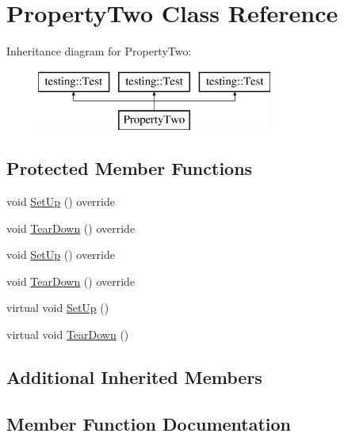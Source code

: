\hypertarget{class_property_two}{}\section{Property\+Two Class Reference}
\label{class_property_two}
Inheritance diagram for Property\+Two\+:\begin{figure}[H]
\begin{center}
\leavevmode
\includegraphics[height=2.000000cm]{d7/d8d/class_property_two}
\end{center}
\end{figure}
\subsection*{Protected Member Functions}
\begin{DoxyCompactItemize}
\item 
void \mbox{\hyperlink{class_property_two_a88216ddb0ed17e58c9f974a743208fca}{Set\+Up}} () override
\item 
void \mbox{\hyperlink{class_property_two_a8c2b36ef29249c5654f13bf8f504236a}{Tear\+Down}} () override
\item 
void \mbox{\hyperlink{class_property_two_a88216ddb0ed17e58c9f974a743208fca}{Set\+Up}} () override
\item 
void \mbox{\hyperlink{class_property_two_a8c2b36ef29249c5654f13bf8f504236a}{Tear\+Down}} () override
\item 
virtual void \mbox{\hyperlink{class_property_two_aa3ab39cf4e6c751cb0788c575bf92ca2}{Set\+Up}} ()
\item 
virtual void \mbox{\hyperlink{class_property_two_aa4ffb2b9dddeba69f0f9baf133f06ef2}{Tear\+Down}} ()
\end{DoxyCompactItemize}
\subsection*{Additional Inherited Members}


\subsection{Member Function Documentation}
\mbox{\label{class_property_two_a88216ddb0ed17e58c9f974a743208fca}} 
